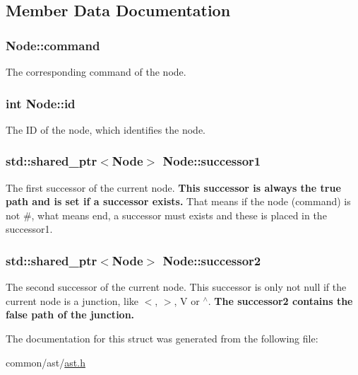 \subsection{Member Data Documentation}
\hypertarget{structNode_a77877b9758bdbfe6de9c1a9cafc76bd4}{
\subsubsection[{command}]{ Node\-::command}}\label{structNode_a77877b9758bdbfe6de9c1a9cafc76bd4}
The corresponding command of the node. \hypertarget{structNode_a59a543130a10c95f1e8642cf8c5645e8}{
\subsubsection[{id}]{\setlength{\rightskip}{0pt plus 5cm}int Node\-::id}}\label{structNode_a59a543130a10c95f1e8642cf8c5645e8}
The I\-D of the node, which identifies the node. \hypertarget{structNode_ab452a3c22bdb42908e040e6f4fe4b097}{
\subsubsection[{successor1}]{\setlength{\rightskip}{0pt plus 5cm}std\-::shared\-\_\-ptr$<${\bf Node}$>$ Node\-::successor1}}\label{structNode_ab452a3c22bdb42908e040e6f4fe4b097}
The first successor of the current node. {\bfseries This successor is always the true path and is set if a successor exists.} That means if the node (command) is not \#, what means end, a successor must exists and these is placed in the successor1. \hypertarget{structNode_a1b5557700bd2ad4b58800bfa15999323}{
\subsubsection[{successor2}]{\setlength{\rightskip}{0pt plus 5cm}std\-::shared\-\_\-ptr$<${\bf Node}$>$ Node\-::successor2}}\label{structNode_a1b5557700bd2ad4b58800bfa15999323}
The second successor of the current node. This successor is only not null if the current node is a junction, like $<$, $>$, V or $^\wedge$. {\bfseries The successor2 contains the false path of the junction.} 

The documentation for this struct was generated from the following file\-:\begin{DoxyCompactItemize}
\item 
common/ast/\hyperlink{ast_8h}{ast.\-h}\end{DoxyCompactItemize}
